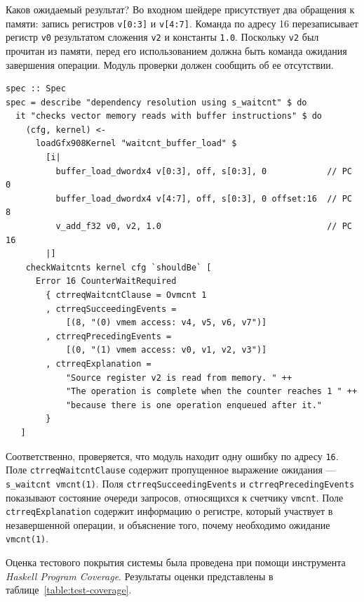 \documentclass[a4paper,14pt]{extarticle}
\begin{document}
{Каков ожидаемый результат? Во входном шейдере присутствует два
обращения к памяти: запись регистров \verb|v[0:3]| и \verb|v[4:7]|.
Команда по адресу 16 перезаписывает регистр \verb|v0| результатом сложения
\verb|v2| и константы \verb|1.0|. Поскольку \verb|v2| был прочитан из памяти,
перед его использованием должна быть команда ожидания завершения операции.
Модуль проверки должен сообщить об ее отсутствии.

\begin{verbatim}
spec :: Spec
spec = describe "dependency resolution using s_waitcnt" $ do
  it "checks vector memory reads with buffer instructions" $ do
    (cfg, kernel) <-
      loadGfx908Kernel "waitcnt_buffer_load" $
        [i|
          buffer_load_dwordx4 v[0:3], off, s[0:3], 0            // PC 0
          buffer_load_dwordx4 v[4:7], off, s[0:3], 0 offset:16  // PC 8
          v_add_f32 v0, v2, 1.0                                 // PC 16
        |]
    checkWaitcnts kernel cfg `shouldBe` [
      Error 16 CounterWaitRequired
        { ctrreqWaitcntClause = Ovmcnt 1
        , ctrreqSucceedingEvents =
            [(8, "(0) vmem access: v4, v5, v6, v7")]
        , ctrreqPrecedingEvents =
            [(0, "(1) vmem access: v0, v1, v2, v3")]
        , ctrreqExplanation =
            "Source register v2 is read from memory. " ++
            "The operation is complete when the counter reaches 1 " ++
            "because there is one operation enqueued after it."
        }
   ]
\end{verbatim}

Соответственно, проверяется, что модуль находит одну ошибку по адресу \verb|16|.
Поле \verb|ctrreqWaitcntClause| содержит пропущенное выражение ожидания —
\verb|s_waitcnt vmcnt(1)|. Поля \verb|ctrreqSucceedingEvents|
и \verb|ctrreqPrecedingEvents| показывают состояние очереди запросов, относящихся
к счетчику \verb|vmcnt|. Поле \verb|ctrreqExplanation| содержит информацию
о регистре, который участвует в незавершенной операции, и объяснение того, почему
необходимо ожидание \verb|vmcnt(1)|.

Оценка тестового покрытия системы была проведена при помощи инструмента
\textit{Haskell Program Coverage}. Результаты оценки представлены в таблице~\ref{table:test-coverage}.

}
\end{document}
